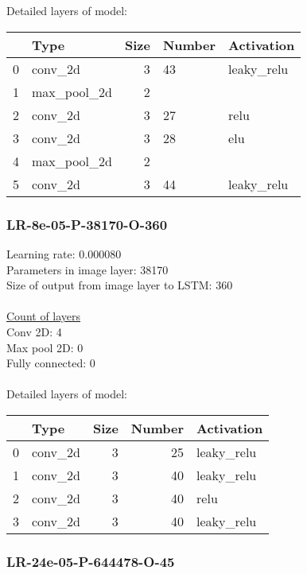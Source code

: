 \\\\Detailed layers of model: \\\begin{tabular}{rlrll}
\hline
    & Type        &   Size & Number   & Activation   \\
\hline
  0 & conv\_2d     &      3 & 43       & leaky\_relu   \\
  1 & max\_pool\_2d &      2 &          &              \\
  2 & conv\_2d     &      3 & 27       & relu         \\
  3 & conv\_2d     &      3 & 28       & elu          \\
  4 & max\_pool\_2d &      2 &          &              \\
  5 & conv\_2d     &      3 & 44       & leaky\_relu   \\
\hline
\end{tabular}\subsubsection*{LR-8e-05-P-38170-O-360}
Learning rate: 0.000080
\\Parameters in image layer: 38170
\\Size of output from image layer to LSTM: 360
\\\\\underline{Count of layers} 
\\Conv 2D:           4\\Max pool 2D:      0\\Fully connected:  0
\\\\Detailed layers of model: \\\begin{tabular}{rlrrl}
\hline
    & Type    &   Size &   Number & Activation   \\
\hline
  0 & conv\_2d &      3 &       25 & leaky\_relu   \\
  1 & conv\_2d &      3 &       40 & leaky\_relu   \\
  2 & conv\_2d &      3 &       40 & relu         \\
  3 & conv\_2d &      3 &       40 & leaky\_relu   \\
\hline
\end{tabular}\subsubsection*{LR-24e-05-P-644478-O-45}
